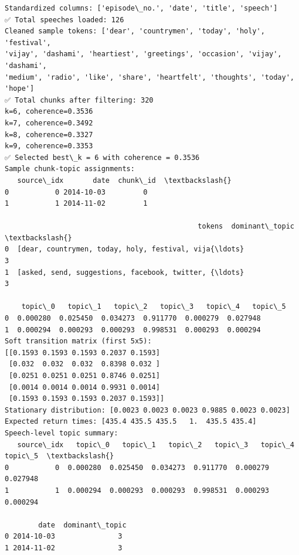 \documentclass[11pt]{article}
\begin{document}
    \begin{Verbatim}[commandchars=\\\{\}]
Standardized columns: ['episode\_no.', 'date', 'title', 'speech']
✅ Total speeches loaded: 126
Cleaned sample tokens: ['dear', 'countrymen', 'today', 'holy', 'festival',
'vijay', 'dashami', 'heartiest', 'greetings', 'occasion', 'vijay', 'dashami',
'medium', 'radio', 'like', 'share', 'heartfelt', 'thoughts', 'today', 'hope']
✅ Total chunks after filtering: 320
k=6, coherence=0.3536
k=7, coherence=0.3492
k=8, coherence=0.3327
k=9, coherence=0.3353
✅ Selected best\_k = 6 with coherence = 0.3536
Sample chunk-topic assignments:
   source\_idx       date  chunk\_id  \textbackslash{}
0           0 2014-10-03         0
1           1 2014-11-02         1

                                              tokens  dominant\_topic  \textbackslash{}
0  [dear, countrymen, today, holy, festival, vija{\ldots}               3
1  [asked, send, suggestions, facebook, twitter, {\ldots}               3

    topic\_0   topic\_1   topic\_2   topic\_3   topic\_4   topic\_5
0  0.000280  0.025450  0.034273  0.911770  0.000279  0.027948
1  0.000294  0.000293  0.000293  0.998531  0.000293  0.000294
Soft transition matrix (first 5x5):
[[0.1593 0.1593 0.1593 0.2037 0.1593]
 [0.032  0.032  0.032  0.8398 0.032 ]
 [0.0251 0.0251 0.0251 0.8746 0.0251]
 [0.0014 0.0014 0.0014 0.9931 0.0014]
 [0.1593 0.1593 0.1593 0.2037 0.1593]]
Stationary distribution: [0.0023 0.0023 0.0023 0.9885 0.0023 0.0023]
Expected return times: [435.4 435.5 435.5   1.  435.5 435.4]
Speech-level topic summary:
   source\_idx   topic\_0   topic\_1   topic\_2   topic\_3   topic\_4   topic\_5  \textbackslash{}
0           0  0.000280  0.025450  0.034273  0.911770  0.000279  0.027948
1           1  0.000294  0.000293  0.000293  0.998531  0.000293  0.000294

        date  dominant\_topic
0 2014-10-03               3
1 2014-11-02               3
    \end{Verbatim}

    \begin{center}
    \end{center}
    { \hspace*{\fill} \\}
    
    \begin{center}
    \end{center}
    { \hspace*{\fill} \\}
    
\end{document}
